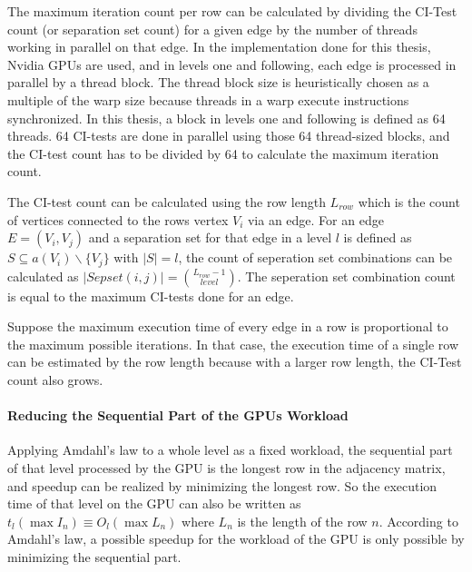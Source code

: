 The maximum iteration count per row can be calculated by dividing the CI-Test count (or separation set count) for a given edge by the number of threads working in parallel on that edge. In the implementation done for this thesis, Nvidia GPUs are used, and in levels one and following, each edge is processed in parallel by a thread block. The thread block size is heuristically chosen as a multiple of the warp size because threads in a warp execute instructions synchronized. In this thesis, a block in levels one and following is defined as 64 threads. 64 CI-tests are done in parallel using those 64 thread-sized blocks, and the CI-test count has to be divided by 64 to calculate the maximum iteration count.

The CI-test count can be calculated using the row length $L_{row}$ which is the count of vertices connected to the rows vertex $V_i$ via an edge. For an edge $E=(V_i,V_j)$ and a separation set for that edge in a level $l$ is defined as $S \subseteq a(V_i ) \backslash \{V_j\}$ with $| S | = l$, the count of seperation set combinations can be calculated as $|Sepset(i,j)| = {L_{row} - 1 \choose level}$. The seperation set combination count is equal to the maximum CI-tests done for an edge.

Suppose the maximum execution time of every edge in a row is proportional to the maximum possible iterations. In that case, the execution time of a single row can be estimated by the row length because with a larger row length, the CI-Test count also grows.

\paragraph{Reducing the Sequential Part of the GPUs Workload}

Applying Amdahl's law \cite{amdahlValiditySingleProcessor1967} to a whole level as a fixed workload, the sequential part of that level processed by the GPU is the longest row in the adjacency matrix, and speedup can be realized by minimizing the longest row. So the execution time of that level on the GPU can also be written as $t_{l}(\max I_n) \equiv O_{l}(\max L_n)$ where $L_n$ is the length of the row $n$. According to Amdahl's law, a possible speedup for the workload of the GPU is only possible by minimizing the sequential part.

